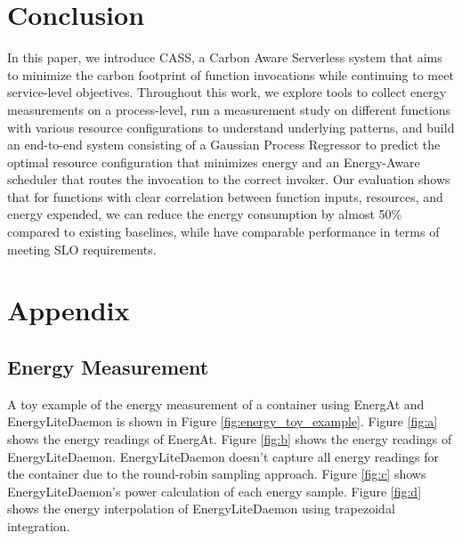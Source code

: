 \documentclass[times, 10pt,twocolumn]{article}
\begin{document}
\section{Conclusion}

In this paper, we introduce CASS, a Carbon Aware Serverless system that aims to minimize the carbon footprint of function invocations while continuing to meet service-level objectives. Throughout this work, we explore tools to collect energy measurements on a process-level, run a measurement study on different functions with various resource configurations to understand underlying patterns, and build an end-to-end system consisting of a Gaussian Process Regressor to predict the optimal resource configuration that minimizes energy and an Energy-Aware scheduler that routes the invocation to the correct invoker. Our evaluation shows that for functions with clear correlation between function inputs, resources, and energy expended, we can reduce the energy consumption by almost 50\% compared to existing baselines, while have comparable performance in terms of meeting SLO requirements. 






\appendix
\section{Appendix}
\subsection{Energy Measurement}
\label{appendix:energy_measurement}
A toy example of the energy measurement of a container using EnergAt and EnergyLiteDaemon is shown in Figure \ref{fig:energy_toy_example}. Figure \ref{fig:a} shows the energy readings of EnergAt. Figure \ref{fig:b} shows the energy readings of EnergyLiteDaemon. EnergyLiteDaemon doesn't capture all energy readings for the container due to the round-robin sampling approach. Figure \ref{fig:c} shows EnergyLiteDaemon's power calculation of each energy sample. Figure \ref{fig:d} shows the energy interpolation of EnergyLiteDaemon using trapezoidal integration.
\end{document}
